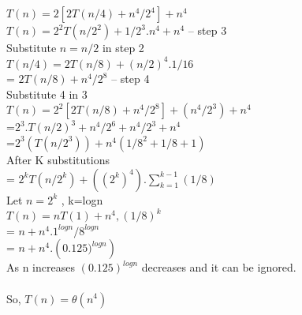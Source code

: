 \documentclass[11pt]{article}
\begin{document}
\begin{enumerate}
$T(n)=2[2T(n/4)+n^4/2^4] + n^4$ \\
$T(n) = 2^2 T(n/2^2) + 1/2^3.n^4+n^4$ -- step 3\\
Substitute  $n=n/2$ in step 2 \\
$T(n/4) = 2T(n/8)+(n/2)^4. 1/16$ \\
        = $2T(n/8) + n^4/2^8$  -- step 4\\

Substitute 4 in 3 \\

$T(n) = 2^2[2T(n/8) + n^4/2^8]+(n^4/2^3)+n^4$ \\
      =$2^3.T(n/2)^3+n^4/2^6+n^4/2^3+n^4 $\\
      =$2^3(T(n/2^3))+n^4(1/8^2 + 1/8 +1)$ \\

After K substitutions \\ 

=  $2^kT(n/2^k)+ ((2^k)^4).\sum_{k=1}^{k-1}(1/8)$ \\

Let $n = 2^k$ , k=logn \\

$T(n) = nT(1)+n^4,(1/8)^k$ \\
      = $n+n^4.{1^{log n}}/{8^{log n}}$ \\
      = $n+n^4.({0.125)^{log n}})$ \\

As n increases $(0.125)^{log n}$ decreases and it can be ignored.\\ \\

So, $T(n) = \theta(n^4)$











\end{enumerate}
\end{document}
